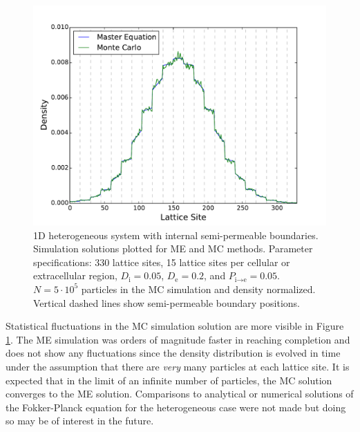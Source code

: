 	\begin{figure}[h]
		\centering
		\includegraphics[width=1.0\linewidth]{../images/1D/11U_heterogeneous_plots_1D}
		\caption[1D: MC and ME solutions for a heterogeneous system]{1D heterogeneous system with internal semi-permeable boundaries. Simulation solutions plotted for ME and MC methods. Parameter specifications: 330 lattice sites, 15 lattice sites per cellular or extracellular region, $ D_\textrm{i} = 0.05 $, $ D_\textrm{e} = 0.2 $, and $ P_{\textrm{i}\rightarrow \textrm{e}} = 0.05 $. $ N = 5 \cdot 10^5 $ particles in the MC simulation and density normalized. Vertical dashed lines show semi-permeable boundary positions.}
		\label{fig:11U_heterogeneous_plots_1D}
	\end{figure}
	
	Statistical fluctuations in the MC simulation solution are more visible in Figure \ref{fig:11U_heterogeneous_plots_1D}. The ME simulation was orders of magnitude faster in reaching completion and does not show any fluctuations since the density distribution is evolved in time under the assumption that there are \textsl{very} many particles at each lattice site. It is expected that in the limit of an infinite number of particles, the MC solution converges to the ME solution. Comparisons to analytical or numerical solutions of the Fokker-Planck equation for the heterogeneous case were not made but doing so may be of interest in the future.
	
